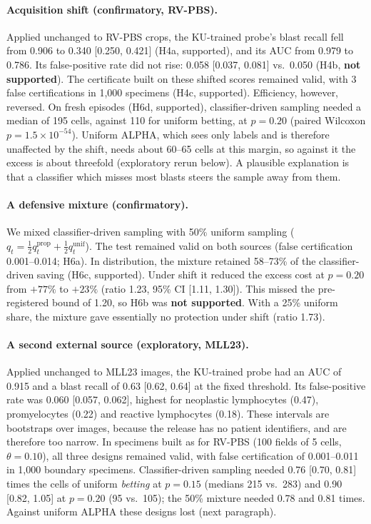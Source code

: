 \documentclass[11pt]{article}
\theoremstyle{remark}
\theoremstyle{definition}
\begin{document}
\paragraph{Acquisition shift (confirmatory, RV-PBS).} Applied unchanged to RV-PBS crops, the KU-trained probe's blast recall fell from 0.906 to 0.340 [0.250, 0.421] (H4a, supported), and its AUC from 0.979 to 0.786. Its false-positive rate did not rise: 0.058 [0.037, 0.081] vs.\ 0.050 (H4b, \textbf{not supported}). The certificate built on these shifted scores remained valid, with 3 false certifications in 1,000 specimens (H4c, supported). Efficiency, however, reversed. On fresh episodes (H6d, supported), classifier-driven sampling needed a median of 195 cells, against 110 for uniform betting, at $p=0.20$ (paired Wilcoxon $p=1.5\times10^{-54}$). Uniform ALPHA, which sees only labels and is therefore unaffected by the shift, needs about 60--65 cells at this margin, so against it the excess is about threefold (exploratory rerun below). A plausible explanation is that a classifier which misses most blasts steers the sample away from them.

\paragraph{A defensive mixture (confirmatory).} We mixed classifier-driven sampling with 50\% uniform sampling ($q_t=\tfrac12 q^{\text{prop}}_t+\tfrac12 q^{\text{unif}}_t$). The test remained valid on both sources (false certification 0.001--0.014; H6a). In distribution, the mixture retained 58--73\% of the classifier-driven saving (H6c, supported). Under shift it reduced the excess cost at $p=0.20$ from $+77\%$ to $+23\%$ (ratio 1.23, 95\% CI [1.11, 1.30]). This missed the pre-registered bound of 1.20, so H6b was \textbf{not supported}. With a 25\% uniform share, the mixture gave essentially no protection under shift (ratio 1.73).

\paragraph{A second external source (exploratory, MLL23).} Applied unchanged to MLL23 images, the KU-trained probe had an AUC of 0.915 and a blast recall of 0.63 [0.62, 0.64] at the fixed threshold. Its false-positive rate was 0.060 [0.057, 0.062], highest for neoplastic lymphocytes (0.47), promyelocytes (0.22) and reactive lymphocytes (0.18). These intervals are bootstraps over images, because the release has no patient identifiers, and are therefore too narrow. In specimens built as for RV-PBS (100 fields of 5 cells, $\theta=0.10$), all three designs remained valid, with false certification of 0.001--0.011 in 1,000 boundary specimens. Classifier-driven sampling needed 0.76 [0.70, 0.81] times the cells of uniform \emph{betting} at $p=0.15$ (medians 215 vs.\ 283) and 0.90 [0.82, 1.05] at $p=0.20$ (95 vs.\ 105); the 50\% mixture needed 0.78 and 0.81 times. Against uniform ALPHA these designs lost (next paragraph).
\end{document}
